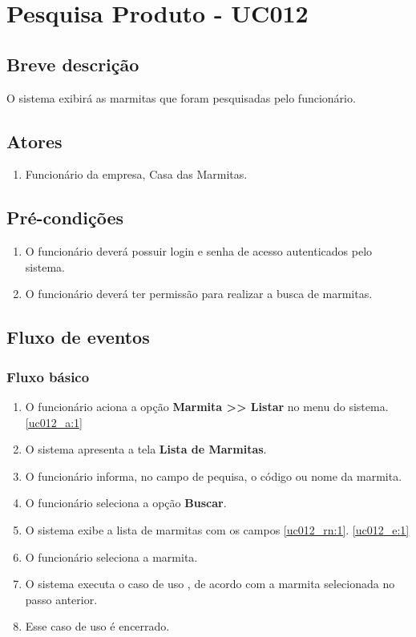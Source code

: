 \chapter{Pesquisa Produto - UC012} \label{uc012}

\section{Breve descrição}

O sistema exibirá as marmitas que foram pesquisadas pelo funcionário.

\section{Atores}

\begin{enumerate}
	\item Funcionário da empresa, Casa das Marmitas.
\end{enumerate}

\section{Pré-condições}

\begin{enumerate}
	\item O funcionário deverá possuir login e senha de acesso autenticados pelo sistema.
	\item O funcionário deverá ter permissão para realizar a busca de marmitas.
\end{enumerate}

\section{Fluxo de eventos}

\subsection{Fluxo básico}

\begin{enumerate}[label=P\arabic*]
	\item O funcionário aciona a opção \textbf{Marmita >> Listar} no menu do sistema. \label{uc012_p:1}\ref{uc012_a:1}
	\item O sistema apresenta a tela \textbf{Lista de Marmitas}.	
	\item O funcionário informa, no campo de pequisa, o código ou nome da marmita. \label{uc012_p:3}
	\item O funcionário seleciona a opção \textbf{Buscar}.
	\item O sistema exibe a lista de marmitas com os campos \ref{uc012_rn:1}. \ref{uc012_e:1}
	\item O funcionário seleciona a marmita.
	\item O sistema executa o caso de uso , de acordo com a marmita selecionada no passo anterior.
	\item Esse caso de uso é encerrado.
\end{enumerate}

